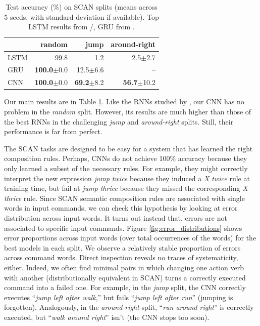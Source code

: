 \begin{table}[tb]
  \begin{footnotesize}
    \begin{center}
          \begin{tabular}{l | r | r | r}
             & \textbf{random} & \textbf{jump} & \textbf{around-right} \\ \hline
             LSTM & 99.8 & 1.2 & 2.5$\pm$2.7 \\
             GRU & \textbf{100.0}$\pm$0.0 & 12.5$\pm$6.6 & --  \\
             \hline
              CNN & \textbf{100.0}$\pm$0.0 & \textbf{69.2}$\pm$8.2 & \textbf{56.7}$\pm$10.2 \\
        \end{tabular} 
    \end{center}
  \end{footnotesize}
  \caption{Test accuracy (\%) on SCAN splits (means across 5 seeds,
    with standard deviation if available). Top LSTM results from
    /, GRU from
      .}
\label{table:main_results} 
\end{table}

Our main results are in Table \ref{table:main_results}. Like the
RNNs studied by , our CNN has no problem in
the \emph{random} split. However, its results are much higher than
those of the best RNNs in the challenging \emph{jump} and
\emph{around-right} splits. Still, their performance is far from perfect.

The SCAN tasks are designed to be easy for a system that has learned
the right composition rules. Perhaps, CNNs do not achieve 100\%
accuracy because they only learned a subset of the necessary
rules. For example, they might correctly interpret the new
expression \emph{jump twice} because they induced a \emph{X twice}
rule at training time, but fail at \emph{jump
  thrice} because they missed the corresponding \emph{X
  thrice} rule. Since SCAN semantic composition rules are associated
with single words in input commands, we can check this hypothesis by
looking at error distribution across input words. It turns out instead that,
errors are not associated to specific input commands.  Figure
\ref{fig:error_distributions} shows error proportions across input
words (over total occurrences of the words) for the best models in
each split. We observe a relatively stable proportion of errors across
command words. Direct inspection reveals no traces of
systematicity, either. Indeed, we often find minimal pairs in which changing
one action verb with another (distributionally equivalent in SCAN)
turns a correctly executed command into a failed one. For
example, in the \emph{jump} split, the CNN correctly executes
``\emph{jump left after walk},'' but fails ``\emph{jump left after
  run}'' (jumping is forgotten). Analogously, in the
\emph{around-right} split, ``\emph{run around right}'' is correctly
executed, but ``\emph{walk around right}'' isn't (the CNN stops too
soon).

